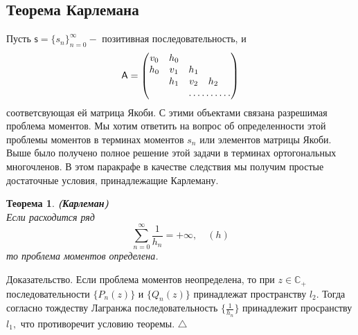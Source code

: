 \documentclass[12pt,a4paper]{article}
\theoremstyle{plain}   \newtheorem{Pro}{Задача}
\newtheorem{The}{Теорема}
\begin{document}
\subsection{Теорема Карлемана}
$ \; $
\\
Пусть
$ \mathsf{s}=\{ s_n \} _{n=0}^{\infty} - $
позитивная последовательность, и
$$
  \mathsf{A}=
    \begin{pmatrix}
	  v_0 & h_0 & \; & \; & \; \\
	  h_0 & v_1 & h_1 & \; & \; \\
	  \; & h_1 & v_2 & h_2 & \; \\
	  \; & \; &  \hdotsfor{3}
	\end{pmatrix}
$$
соответсвующая ей матрица Якоби. С этими объектами связана
разрешимая проблема моментов. Мы хотим ответить на вопрос
об определенности этой проблемы моментов в терминах моментов
$ s_n $
или элементов матрицы Якоби. Выше было получено полное
решение этой задачи в терминах ортогональных многочленов.
В этом паракрафе в качестве следствия мы
получим простые достаточные условия, принадлежащие Карлеману.
\begin{The}
{\bfseries (Карлеман)}
\\
Если расходится ряд
$$
  \sum _{n=0}^{\infty} \frac{1}{h_n }=+\infty ,
  \quad (h)
$$
то проблема моментов определена.
\end{The}
{\Large Доказательство.}
Если проблема моментов неопределена, то при
$ z\in \mathbb{C}_+ $
последовательности
$ \{P_n (z) \} $
и
$ \{ Q_n (z) \} $
принадлежат пространству
$ l_2 . $
Тогда согласно тождеству Лагранжа последовательность
$ \{ \frac{1}{h_n} \} $
принадлежит просранству
$ l_1 , $
что противоречит условию теоремы.
$ \triangle $
\\
\end{document}
